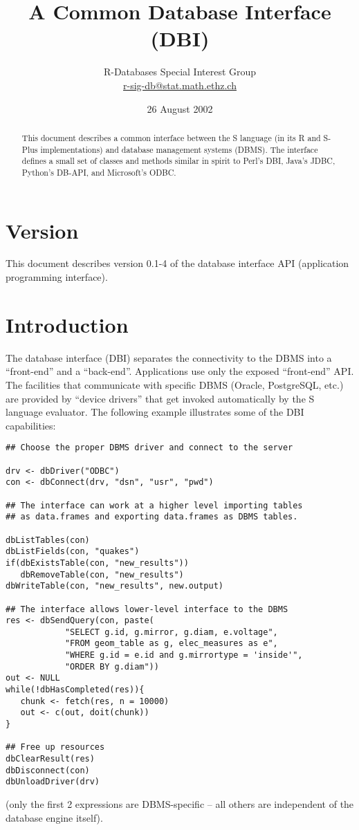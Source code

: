 \documentclass[graphics,times,psfig,dvips,hyper]{article}
\begin{document}
\title{A Common Database Interface (DBI)}
\author{
R-Databases Special Interest Group\\
\href{mailto:r-sig-db@stat.math.ethz.ch}{r-sig-db@stat.math.ethz.ch}
}

\date{26 August 2002}

\maketitle 
\tableofcontents

\begin{abstract}
This document describes a common interface between the S language 
(in its R and S-Plus implementations) and database management systems
(DBMS).  The interface defines a small set of classes and methods
similar in spirit to Perl's DBI, Java's JDBC, Python's DB-API,
and Microsoft's ODBC.
\end{abstract}

\section{Version}\label{sec:version}
This document describes version 0.1-4 of the database interface
API (application programming interface).

\section{Introduction}\label{sec:intro}

The database interface (DBI) separates the connectivity to the DBMS
into a ``front-end'' and a ``back-end''.  Applications use only the
exposed ``front-end'' API.  The facilities that communicate with
specific DBMS (Oracle, PostgreSQL, etc.) are provided by ``device
drivers'' that get invoked automatically by the S language evaluator.
The following example illustrates some of the DBI capabilities:
\begin{verbatim}
## Choose the proper DBMS driver and connect to the server

drv <- dbDriver("ODBC")
con <- dbConnect(drv, "dsn", "usr", "pwd")

## The interface can work at a higher level importing tables 
## as data.frames and exporting data.frames as DBMS tables.

dbListTables(con)
dbListFields(con, "quakes")
if(dbExistsTable(con, "new_results"))
   dbRemoveTable(con, "new_results")
dbWriteTable(con, "new_results", new.output)

## The interface allows lower-level interface to the DBMS
res <- dbSendQuery(con, paste(
            "SELECT g.id, g.mirror, g.diam, e.voltage",
            "FROM geom_table as g, elec_measures as e",
            "WHERE g.id = e.id and g.mirrortype = 'inside'",
            "ORDER BY g.diam"))
out <- NULL
while(!dbHasCompleted(res)){
   chunk <- fetch(res, n = 10000)
   out <- c(out, doit(chunk))
}

## Free up resources
dbClearResult(res)
dbDisconnect(con)
dbUnloadDriver(drv)
\end{verbatim}
(only the first 2 expressions are DBMS-specific -- all others are
independent of the database engine itself).
\end{document}
